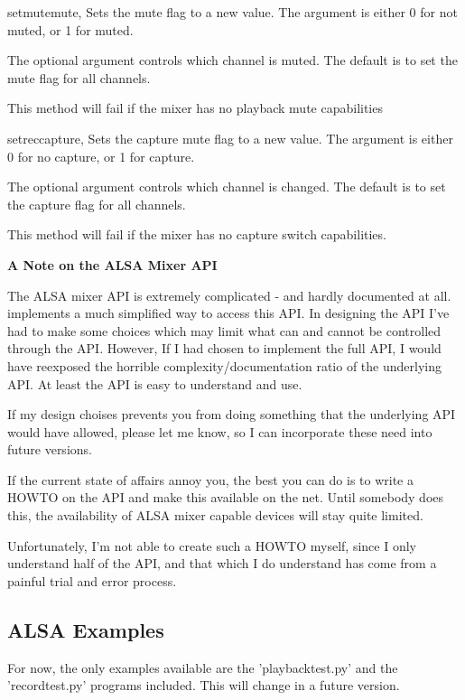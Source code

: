 \begin{methoddesc}[Mixer]{setmute}{mute, }
  Sets the mute flag to a new value. The  argument is either
  0 for not muted, or 1 for muted.

  The optional  argument controls which channel is muted.
  The default is to set the mute flag for all channels.

  This method will fail if the mixer has no playback mute capabilities
\end{methoddesc}

\begin{methoddesc}[Mixer]{setrec}{capture,}
  Sets the capture mute flag to a new value. The 
  argument is either 0 for no capture, or 1 for capture.

  The optional  argument controls which channel is
  changed. The default is to set the capture flag for all channels.

  This method will fail if the mixer has no capture switch
  capabilities.
\end{methoddesc}


\textbf{A Note on the ALSA Mixer API}

The ALSA mixer API is extremely complicated - and hardly documented at
all.  implements a much simplified way to access
this API. In designing the API I've had to make some choices which may
limit what can and cannot be controlled through the API. However, If I
had chosen to implement the full API, I would have reexposed the
horrible complexity/documentation ratio of the underlying API.  At
least the  API is easy to understand and use.

If my design choises prevents you from doing something that the
underlying API would have allowed, please let me know, so I can
incorporate these need into future versions.

If the current state of affairs annoy you, the best you can do is to
write a HOWTO on the API and make this available on the net. Until
somebody does this, the availability of ALSA mixer capable devices
will stay quite limited.

Unfortunately, I'm not able to create such a HOWTO myself, since I
only understand half of the API, and that which I do understand has
come from a painful trial and error process.



\subsection{ALSA Examples \label{pcm-example}}

For now, the only examples available are the 'playbacktest.py' and the
'recordtest.py' programs included.  This will change in a future
version.
